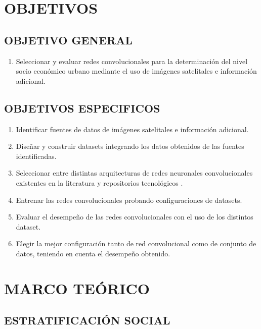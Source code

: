     \newpage\chapter{OBJETIVOS} 
	\section{OBJETIVO GENERAL}
	\begin{enumerate}
	\item Seleccionar y evaluar redes convolucionales para la determinación del nivel socio económico urbano mediante el uso de imágenes satelitales e información adicional.
	\end{enumerate}
    \section{OBJETIVOS ESPECIFICOS}
    \begin{enumerate}
      \item Identificar fuentes de datos de imágenes satelitales e información adicional.
      \item Diseñar y construir datasets integrando los datos obtenidos de las fuentes identificadas.
      \item Seleccionar entre distintas arquitecturas de redes neuronales convolucionales existentes en la literatura y repositorios tecnológicos    .
      \item Entrenar las redes convolucionales probando configuraciones de datasets.
      \item Evaluar el desempeño de las redes convolucionales con el uso de los distintos dataset. 
      \item Elegir la mejor configuración tanto de red convolucional como de conjunto de datos, teniendo en cuenta el desempeño obtenido.   
    \end{enumerate}

    \newpage\chapter{MARCO TEÓRICO}    
    
     
    
	\section{ESTRATIFICACIÓN SOCIAL}
    
